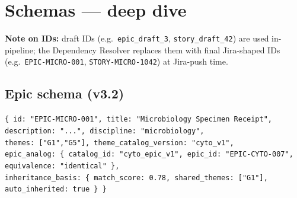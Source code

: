 \documentclass[10pt,letterpaper]{article}
\begin{document}
\section{Schemas --- deep dive}

\textbf{Note on IDs:} draft IDs (e.g.\ \texttt{epic\_draft\_3}, \texttt{story\_draft\_42}) are used in-pipeline; the Dependency Resolver replaces them with final Jira-shaped IDs (e.g.\ \texttt{EPIC-MICRO-001}, \texttt{STORY-MICRO-1042}) at Jira-push time.

\subsection{Epic schema (v3.2)}

\noindent\texttt{\scriptsize \{ id: "EPIC-MICRO-001", title: "Microbiology Specimen Receipt",\\
\hspace*{1em}description: "...", discipline: "microbiology",\\
\hspace*{1em}themes: ["G1","G5"], theme\_catalog\_version: "cyto\_v1",\\
\hspace*{1em}epic\_analog: \{ catalog\_id: "cyto\_epic\_v1", epic\_id: "EPIC-CYTO-007", equivalence: "identical" \},\\
\hspace*{1em}inheritance\_basis: \{ match\_score: 0.78, shared\_themes: ["G1"], auto\_inherited: true \} \}}
\end{document}
